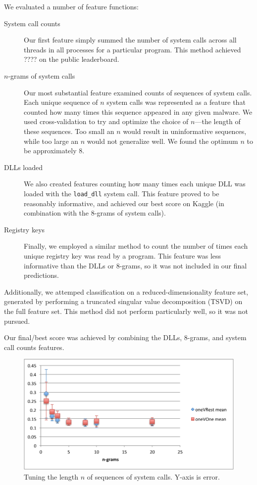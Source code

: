 \documentclass[11pt]{amsart}
\begin{document}
We evaluated a number of feature functions:
\begin{description}
  \item[System call counts] Our first feature simply summed the number of system calls across all threads in all processes for a particular program. This method achieved ???? on the public leaderboard.
  \item[$n$-grams of system calls] Our most substantial feature examined counts of sequences of system calls. Each unique sequence of $n$ system calls was represented as a feature that counted how many times this sequence appeared in any given malware. We used cross-validation to try and optimize the choice of $n$---the length of these sequences. Too small an $n$ would result in uninformative sequences, while too large an $n$ would not generalize well. We found the optimum $n$ to be approximately 8. 
  \item[DLLs loaded] We also created features counting how many times each unique DLL was loaded with the \verb|load_dll| system call. This feature proved to be reasonably informative, and achieved our best score on Kaggle (in combination with the 8-grams of system calls). 
  \item[Registry keys] Finally, we employed a similar method to count the number of times each unique registry key was read by a program. This feature was less informative than the DLLs or 8-grams, so it was not included in our final predictions.
\end{description}

Additionally, we attemped classification on a reduced-dimensionality feature set, generated by performing a truncated singular value decomposition (TSVD) on the full feature set. This method did not perform particularly well, so it was not pursued. 

Our final/best score was achieved by combining the DLLs, 8-grams, and system call counts features.

\begin{figure}
  \includegraphics{n-grams.pdf}
  \caption{Tuning the length $n$ of sequences of system calls. Y-axis is error.}
\end{figure}
\end{document}
